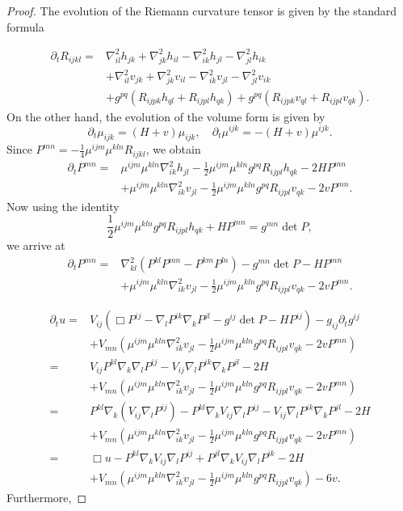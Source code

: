 \documentclass{amsart}
\theoremstyle{definition}
\theoremstyle{remark}
\numberwithin{equation}{section}
\begin{document}
\begin{proof}
The evolution of the Riemann curvature tensor is given by the standard formula

\begin{align*}
\partial_t R_{ijkl}=&\nabla_{il}^2h_{jk}+\nabla^2_{jk}h_{il}-\nabla^2_{ik}h_{jl}-\nabla^2_{jl}h_{ik}\\
&+\nabla_{il}^2v_{jk}+\nabla^2_{jk}v_{il}-\nabla^2_{ik}v_{jl}-\nabla^2_{jl}v_{ik}\\
&+g^{pq}(R_{ijpk}h_{ql}+R_{ijpl}h_{qk})+g^{pq}(R_{ijpk}v_{ql}+R_{ijpl}v_{qk}).
\end{align*}
On the other hand, the evolution of the volume form is given by $$\partial_t\mu_{ijk}=(H+v)\mu_{ijk},\quad\partial_t\mu^{ijk}=-(H+v)\mu^{ijk}.$$
Since $P^{mn}=-\frac{1}{4}\mu^{ijm}\mu^{kln}R_{ijkl}$, we obtain
\begin{align*}
\partial_tP^{mn}=&\mu^{ijm}\mu^{kln}\nabla^2_{ik}h_{jl}-\frac{1}{2}\mu^{ijm}\mu^{kln}g^{pq}R_{ijpl}h_{qk}-2HP^{mn}\\
&+\mu^{ijm}\mu^{kln}\nabla^2_{ik}v_{jl}-\frac{1}{2}\mu^{ijm}\mu^{kln}g^{pq}R_{ijpl}v_{qk}-2vP^{mn}.
\end{align*}
Now using the identity
\[\frac{1}{2}\mu^{ijm}\mu^{kln}g^{pq}R_{ijpl}h_{qk}+HP^{mn}=g^{mn}\det P,\]
we arrive at
\begin{align*}
\partial_tP^{mn}=&\nabla^2_{kl}(P^{kl}P^{mn}-P^{km}P^{ln})-g^{mn}\det P-HP^{mn}\\
&+\mu^{ijm}\mu^{kln}\nabla^2_{ik}v_{jl}-\frac{1}{2}\mu^{ijm}\mu^{kln}g^{pq}R_{ijpl}v_{qk}-2vP^{mn}.
\end{align*}

\begin{align*}
\partial_t u=& V_{ij}\left(\Box P^{ij}-\nabla_lP^{ik}\nabla_kP^{jl}-g^{ij}\det P -HP^{ij}\right)- g_{ij}\partial_t g^{ij}\\
&+V_{mn}(\mu^{ijm}\mu^{kln}\nabla^2_{ik}v_{jl}-\frac{1}{2}\mu^{ijm}\mu^{kln}g^{pq}R_{ijpl}v_{qk}-2vP^{mn})\\
=&V_{ij}P^{kl}\nabla_k\nabla_lP^{ij}- V_{ij}\nabla_lP^{ik}\nabla_kP^{jl}-2H\\
&+V_{mn}(\mu^{ijm}\mu^{kln}\nabla^2_{ik}v_{jl}-\frac{1}{2}\mu^{ijm}\mu^{kln}g^{pq}R_{ijpl}v_{qk}-2vP^{mn})\\
=&P^{kl}\nabla_k\left(V_{ij}\nabla_lP^{ij}\right)-P^{kl}\nabla_k V_{ij}\nabla_l P^{ij}-V_{ij}\nabla_lP^{ik}\nabla_kP^{jl}-2H\\
&+V_{mn}(\mu^{ijm}\mu^{kln}\nabla^2_{ik}v_{jl}-\frac{1}{2}\mu^{ijm}\mu^{kln}g^{pq}R_{ijpl}v_{qk}-2vP^{mn})\\
=&\Box u-P^{kl}\nabla_k V_{ij}\nabla_l P^{ij}+P^{jl}\nabla_kV_{ij}\nabla_lP^{ik}-2H\\
&+V_{mn}(\mu^{ijm}\mu^{kln}\nabla^2_{ik}v_{jl}-\frac{1}{2}\mu^{ijm}\mu^{kln}g^{pq}R_{ijpl}v_{qk})-6v.
\end{align*}
Furthermore,


\end{proof}
\end{document}
